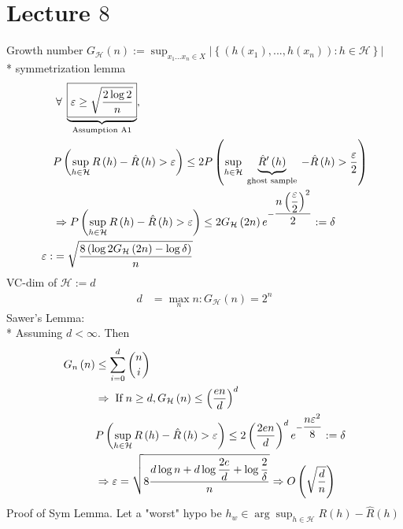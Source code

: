 \documentclass{article}
\begin{document}
\section{Lecture $8$} 
Growth number $G_{\mathcal{H}}\left(n\right) := \displaystyle\sup_{x_{1} ... x_{n} \in X} \left|  \left\{\left(h\left(x_{1}\right), ..., h\left(x_{n}\right)\right) : h \in \mathcal{H}\right\}  \right|$
\\* symmetrization lemma
\begin{align*}
&\;\forall\; \underbrace{\boxed{\varepsilon \geq  \sqrt{\dfrac{2 \log 2}{n}}}}_{\text{\;Assumption A1\;}},
\\ &  P\left(\displaystyle\sup_{h \in \mathcal{H}} R\left(h\right) - \hat{R}\left(h\right) > \varepsilon\right) \leq  2 P\left(\displaystyle\sup_{h \in \mathcal{H}} \underbrace{\hat{R}'\left(h\right)}_{\text{\;ghost sample\;}} - \hat{R}\left(h\right) > \dfrac{\varepsilon}{2}\right)
\\ &\Rightarrow  P\left(\displaystyle\sup_{h \in \mathcal{H}} R\left(h\right) - \hat{R}\left(h\right) > \varepsilon\right) \leq  2 G_{\mathcal{H}}\left(2 n \right) e^{- \dfrac{n \left(\dfrac{\varepsilon}{2}\right)^{2}}{2}} := \delta
\\ \varepsilon :&= \sqrt{\dfrac{8 \left(\log 2 G_{\mathcal{H}}\left(2 n\right) - \log \delta\right)}{n}}
\end{align*}
VC-dim of $\mathcal{H} := d $
\begin{align*}
d  &= \displaystyle\max_{n} n : G_{\mathcal{H}}\left(n\right) = 2^{n}
\end{align*}
Sawer's Lemma:
\\* Assuming $d  < \infty$. Then
\begin{align*}
G_{n}\left(n\right) &\leq  \displaystyle\sum_{i=0}^{d} \dbinom{n}{i}
\\ &\Rightarrow  \text{\;If\;} n  \geq  d, G_{\mathcal{H}}\left(n\right) \leq  \left(\dfrac{e n}{d}\right)^{d}
\\ &  P\left(\displaystyle\sup_{h \in \mathcal{H}} R\left(h\right) - \hat{R}\left(h\right) > \varepsilon\right)  \leq  2 \left(\dfrac{2 e n}{d}\right)^{d} e^{- \dfrac{n \varepsilon^{2}}{8}} := \delta
\\ &\Rightarrow  \varepsilon = \sqrt{8 \dfrac{d \log n + d \log \dfrac{2 e}{d} + \log \dfrac{2}{\delta}}{n}} \Rightarrow  O\left(\sqrt{ \dfrac{d}{n}}\right)
\end{align*}
Proof of Sym Lemma. Let a "worst" hypo be $h_{w} \in \arg\displaystyle\sup_{h \in \mathcal{H}} R\left(h\right) - \hat{R}\left(h\right)$
\end{document}
